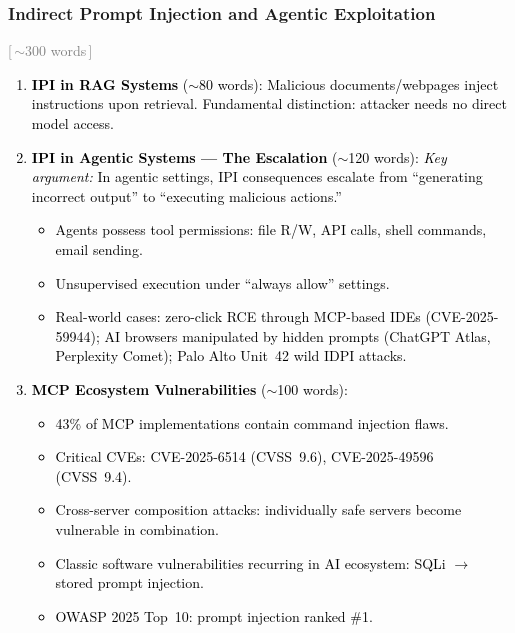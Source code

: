 \documentclass[preprint,12pt]{elsarticle}
\newcommand{\wordcount}[1]{\hfill\textcolor{gray}{\small[\,#1\,]}}
\newcommand{\outline}[1]{\textcolor{black}{#1}}
\begin{document}
\subsubsection{Indirect Prompt Injection and Agentic Exploitation} \wordcount{$\sim$300 words}

\outline{%
\begin{enumerate}[nosep,leftmargin=1.5em,label=(\alph*)]
    \item \textbf{IPI in RAG Systems} ($\sim$80 words): Malicious documents/webpages inject instructions upon retrieval. Fundamental distinction: attacker needs no direct model access.
    
    \item \textbf{IPI in Agentic Systems --- The Escalation} ($\sim$120 words): 
    \emph{Key argument:} In agentic settings, IPI consequences escalate from ``generating incorrect output'' to ``executing malicious actions.''
    \begin{itemize}[nosep,leftmargin=1em]
        \item Agents possess tool permissions: file R/W, API calls, shell commands, email sending.
        \item Unsupervised execution under ``always allow'' settings.
        \item Real-world cases: zero-click RCE through MCP-based IDEs (CVE-2025-59944); AI browsers manipulated by hidden prompts (ChatGPT Atlas, Perplexity Comet); Palo Alto Unit~42 wild IDPI attacks.
    \end{itemize}
    
    \item \textbf{MCP Ecosystem Vulnerabilities} ($\sim$100 words):
    \begin{itemize}[nosep,leftmargin=1em]
        \item 43\% of MCP implementations contain command injection flaws.
        \item Critical CVEs: CVE-2025-6514 (CVSS~9.6), CVE-2025-49596 (CVSS~9.4).
        \item Cross-server composition attacks: individually safe servers become vulnerable in combination.
        \item Classic software vulnerabilities recurring in AI ecosystem: SQLi $\to$ stored prompt injection.
        \item OWASP 2025 Top~10: prompt injection ranked \#1.
    \end{itemize}
\end{enumerate}
}
\end{document}
